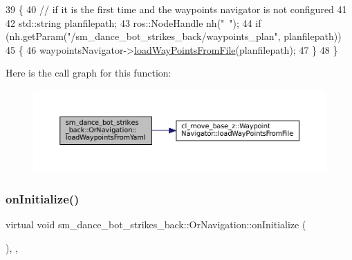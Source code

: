 \begin{DoxyCode}
39     \{
40         \textcolor{comment}{// if it is the first time and the waypoints navigator is not configured}
41 
42         std::string planfilepath;
43         ros::NodeHandle nh(\textcolor{stringliteral}{"~"});
44         \textcolor{keywordflow}{if} (nh.getParam(\textcolor{stringliteral}{"/sm\_dance\_bot\_strikes\_back/waypoints\_plan"}, planfilepath))
45         \{
46             waypointsNavigator->\hyperlink{classcl__move__base__z_1_1WaypointNavigator_a18d74467ddf0e637a8d5a6e1fa2e93db}{loadWayPointsFromFile}(planfilepath);
47         \}
48     \}
\end{DoxyCode}
Here is the call graph for this function\+:
\nopagebreak
\begin{figure}[H]
\begin{center}
\leavevmode
\includegraphics[width=350pt]{classsm__dance__bot__strikes__back_1_1OrNavigation_abd8811831075be61ad28fe4a68fc738d_cgraph}
\end{center}
\end{figure}
\mbox{\label{classsm__dance__bot__strikes__back_1_1OrNavigation_a458a0c5fed04b9906c6943f1e7ac5bf0}} 
\subsubsection{\texorpdfstring{on\+Initialize()}{onInitialize()}}
{\footnotesize\ttfamily virtual void sm\+\_\+dance\+\_\+bot\+\_\+strikes\+\_\+back\+::\+Or\+Navigation\+::on\+Initialize (\begin{DoxyParamCaption}{ }\end{DoxyParamCaption})\hspace{0.3cm}{\ttfamily [inline]}, {\ttfamily [override]}, {\ttfamily [virtual]}}



